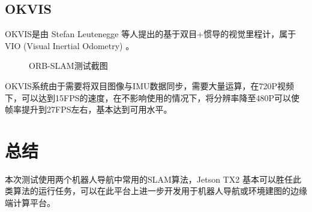 \documentclass{article}
\begin{document}
\subsection{OKVIS}
OKVIS是由 Stefan Leutenegge 等人提出的基于双目+惯导的视觉里程计，属于 VIO (Visual Inertial Odometry) 。
\begin{figure}[h]
    \centering
    \caption{ORB-SLAM测试截图}
\end{figure}
OKVIS系统由于需要将双目图像与IMU数据同步，需要大量运算，在720P视频下，可以达到15FPS的速度，在不影响使用的情况下，将分辨率降至480P可以使帧率提升到27FPS左右，基本达到可用水平。

\section{总结}
本次测试使用两个机器人导航中常用的SLAM算法，Jetson TX2 基本可以胜任此类算法的运行任务，可以在此平台上进一步开发用于机器人导航或环境建图的边缘端计算平台。
\end{document}
